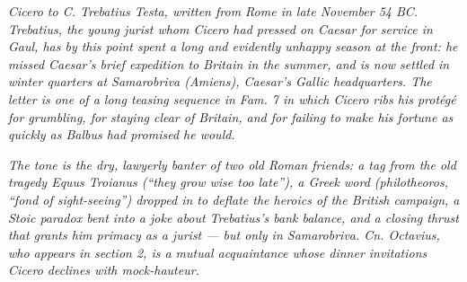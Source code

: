 
\textit{Cicero to C. Trebatius Testa, written from Rome in late
November 54 BC. Trebatius, the young jurist whom Cicero had pressed
on Caesar for service in Gaul, has by this point spent a long and
evidently unhappy season at the front: he missed Caesar's brief
expedition to Britain in the summer, and is now settled in winter
quarters at Samarobriva (Amiens), Caesar's Gallic headquarters. The
letter is one of a long teasing sequence in \textit{Fam.} 7 in which
Cicero ribs his protégé for grumbling, for staying clear of Britain,
and for failing to make his fortune as quickly as Balbus had promised
he would.}

\textit{The tone is the dry, lawyerly banter of two old Roman
friends: a tag from the old tragedy \textit{Equus Troianus} (``they
grow wise too late''), a Greek word (\textit{philotheoros}, ``fond of
sight-seeing'') dropped in to deflate the heroics of the British
campaign, a Stoic paradox bent into a joke about Trebatius's bank
balance, and a closing thrust that grants him primacy as a jurist
--- but only in Samarobriva. Cn. Octavius, who appears in section 2,
is a mutual acquaintance whose dinner invitations Cicero declines
with mock-hauteur.}
